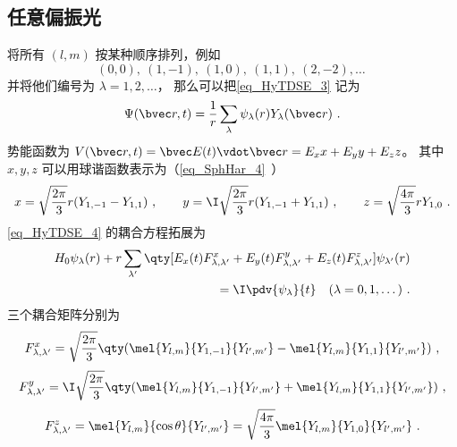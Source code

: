 \subsection{任意偏振光}
将所有 $(l,m)$ 按某种顺序排列，例如
\begin{equation}
(0, 0),\ (1,-1),\ (1,0),\ (1,1),\ (2,-2), \dots~
\end{equation}
并将他们编号为 $\lambda = 1,2, \dots$， 那么可以把\autoref{eq_HyTDSE_3} 记为
\begin{equation}
\Psi(\bvec r, t) = \frac{1}{r}\sum_\lambda \psi_\lambda(r) Y_\lambda(\bvec r)~.
\end{equation}
势能函数为 $V(\bvec r, t) = \bvec E(t) \vdot \bvec r  = E_x x + E_y y + E_z z$。 其中 $x,y,z$ 可以用球谐函数表示为（\autoref{eq_SphHar_4}~）
\begin{equation}
x = \sqrt{\frac{2\pi}{3}} r (Y_{1,-1} - Y_{1,1})~, \qquad
y = \I \sqrt{\frac{2\pi}{3}} r (Y_{1,-1}+Y_{1,1})~, \qquad
z = \sqrt{\frac{4\pi}{3}} rY_{1,0}~.
\end{equation}
\autoref{eq_HyTDSE_4} 的耦合方程拓展为
\begin{equation}
\begin{aligned}
H_0 \psi_{\lambda}(r) + r \sum_{\lambda'} \qty[E_x(t) F_{\lambda, \lambda'}^{x} + E_y(t) F_{\lambda, \lambda'}^{y} + E_z(t) F_{\lambda, \lambda'}^{z}] \psi_{\lambda'}(r) \\
= \I \pdv{\psi_{\lambda}}{t} \quad (\lambda=0,1,\dots)~.
\end{aligned}
\end{equation}
三个耦合矩阵分别为
\begin{equation}
\begin{aligned}
F_{\lambda,\lambda'}^{x} = \sqrt{\frac{2\pi}{3}} \qty(\mel{Y_{l,m}}{Y_{1,-1}}{Y_{l',m'}} - \mel{Y_{l,m}}{Y_{1,1}}{Y_{l',m'}})~,
\end{aligned}
\end{equation}
\begin{equation}
\begin{aligned}
F_{\lambda,\lambda'}^{y} = \I\sqrt{\frac{2\pi}{3}} \qty(\mel{Y_{l,m}}{Y_{1,-1}}{Y_{l',m'}} + \mel{Y_{l,m}}{Y_{1,1}}{Y_{l',m'}})~,
\end{aligned}
\end{equation}
\begin{equation}\label{eq_HyTDSE_10}
\begin{aligned}
F_{\lambda,\lambda'}^{z} = \mel{Y_{l,m}}{\cos\theta}{Y_{l',m'}}
= \sqrt{\frac{4\pi}{3}} \mel{Y_{l,m}}{Y_{1,0}}{Y_{l',m'}}~.
\end{aligned}
\end{equation}
